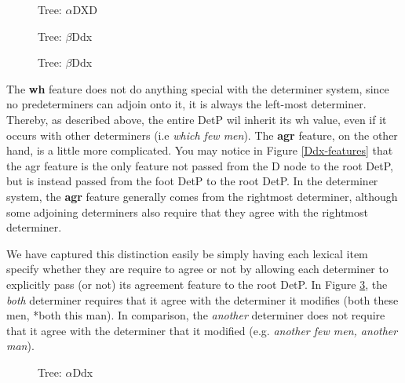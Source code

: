 \begin{figure}[ht]
\centering
{}
\caption{ \label{DXD} Tree:  $\alpha$DXD}
\end{figure}


\begin{figure}[ht]
\centering
{}
\caption{\label{Dds-features} Tree:  $\beta$Ddx}
\end{figure}



\begin{figure}[ht]
\centering
{}
\caption{ \label{Ddx_both} Tree:  $\beta$Ddx}
\end{figure}


The {\bf wh} feature does not do anything special with the determiner system, since
no predeterminers can adjoin onto it, it is always the left-most determiner.
Thereby, as described above, the entire DetP wil inherit its wh value, even if
it occurs with other determiners (i.e {\it which few men}).  The {\bf agr} feature, on
the other hand, is a little more complicated.  You may notice in Figure \ref{Ddx-features} that the agr feature is the only feature not passed from
the D node to the root DetP, but is instead passed from the foot DetP to the
root DetP.  In the determiner system, the {\bf agr} feature generally comes from the
rightmost determiner, although some adjoining determiners also require that
they agree with the rightmost determiner.  


We have captured this distinction easily be simply having each
lexical item specify whether they are require to agree or not by allowing each
determiner to explicitly pass (or not) its agreement feature to the root DetP.
In Figure \ref{Ddx_both}, the {\it both} determiner requires that it
agree with the determiner it modifies (both these men, *both this man).  In
comparison, the {\it another} determiner does not require that it agree with the
determiner that it modified (e.g. {\it another few men, another man}).  


\begin{figure}[ht]
\centering
{}
\caption{ Tree:  $\alpha$Ddx}
\end{figure}

